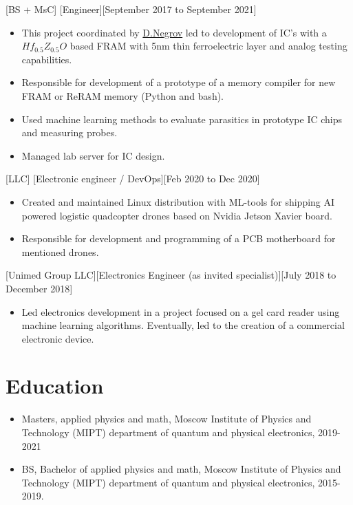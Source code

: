 \documentclass{article}
\begin{document}
[BS + MsC]
[Engineer][September 2017 to September 2021]
\begin{itemize}
\item This project coordinated by  \href{https://www.scopus.com/authid/detail.uri?authorId=56272708000}{D.Negrov} led to development of IC's with a $Hf_{0.5} Z_{0.5} O $ based  FRAM with 5nm thin ferroelectric layer and analog testing capabilities.
\item Responsible for development of a prototype of a memory  compiler for new FRAM or ReRAM memory (Python and bash).
\item Used machine learning methods to evaluate parasitics in prototype IC chips and measuring probes.
\item Managed lab server for IC design.
\end{itemize}

[LLC]
[Electronic engineer / DevOps][Feb 2020 to Dec 2020]
\begin{itemize}
\item Created and maintained Linux distribution with ML-tools for shipping AI powered logistic quadcopter drones based on Nvidia Jetson Xavier board.
\item Responsible for development and programming of a PCB motherboard for mentioned drones.
\end{itemize}
 
 
[Unimed Group LLC][Electronics Engineer (as invited specialist)][July 2018 to December 2018]
 
\begin{itemize}
\item Led electronics development in a project focused on a gel card reader using machine learning algorithms. Eventually, led to the creation of a commercial electronic device.
\end{itemize}
 
 
\section{Education}
 
\begin{itemize}
\item Masters, applied physics and math, Moscow Institute of Physics and Technology (MIPT) department of quantum and physical electronics, 2019-2021
\item BS, Bachelor of applied physics and math, Moscow Institute of Physics and Technology (MIPT) department of quantum and physical electronics, 2015-2019.
\end{itemize}
\end{document}
